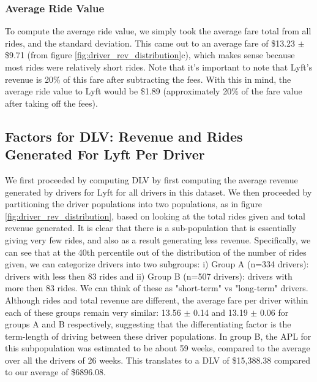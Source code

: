 \documentclass{report}
\begin{document}
	\subsubsection{Average Ride Value}

		To compute the average ride value, we simply took the average fare total from all rides, and the standard deviation. This came out to an average fare of \$13.23 $\pm$ \$9.71 (from figure \ref{fig:driver_rev_distribution}c), which makes sense because most rides were relatively short rides. Note that it's important to note that Lyft's revenue is 20\% of this fare after subtracting the fees. With this in mind, the average ride value to Lyft would be \$1.89 (approximately 20\% of the fare value after taking off the fees). 

	\subsection{Factors for DLV: Revenue and Rides Generated For Lyft Per Driver}
		We first proceeded by computing DLV by first computing the average revenue generated by drivers for Lyft for all drivers in this dataset. We then proceeded by partitioning the driver populations into two populations, as in figure \ref{fig:driver_rev_distribution}, based on looking at the total rides given and total revenue generated. It is clear that there is a sub-population that is essentially giving very few rides, and also as a result generating less revenue. Specifically, we can see that at the 40th percentile out of the distribution of the number of rides given, we can categorize drivers into two subgroups: i) Group A (n=334 drivers): drivers with less then 83 rides and ii) Group B (n=507 drivers): drivers with more then 83 rides. We can think of these as "short-term" vs "long-term" drivers. Although rides and total revenue are different, the average fare per driver within each of these groups remain very similar: 13.56 $\pm$ 0.14 and 13.19 $\pm$ 0.06 for groups A and B respectively, suggesting that the differentiating factor is the term-length of driving between these driver populations. In group B, the APL for this subpopulation was estimated to be about 59 weeks, compared to the average over all the drivers of 26 weeks. This translates to a DLV of \$15,388.38 compared to our average of \$6896.08.
\end{document}
